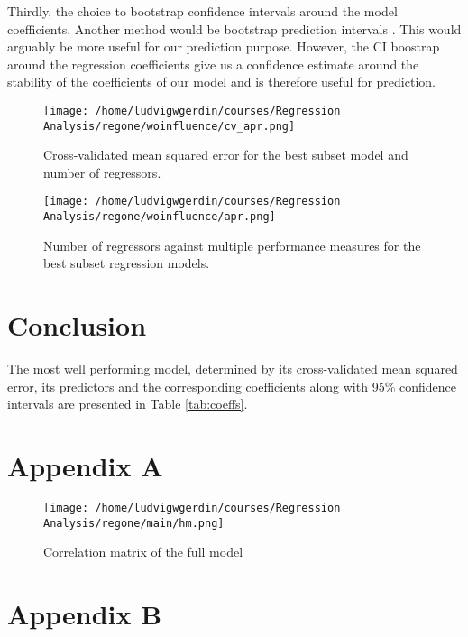 \documentclass[11pt]{article}
\begin{document}
Thirdly, the choice to bootstrap confidence intervals around the model coefficients. Another method 
would be bootstrap prediction intervals \cite{davison_hinkley_1997}. This 
would arguably be more useful for our prediction purpose. However, the CI boostrap around the regression 
coefficients give us a confidence estimate around the stability of the coefficients of our model and is
therefore useful for prediction.



\begin{figure}[htbp]
\centering
\texttt{[image: /home/ludvigwgerdin/courses/Regression Analysis/regone/woinfluence/cv\_apr.png]}
\caption{\label{fig:org2548892}
Cross-validated mean squared error for the best subset model and number of regressors.}
\end{figure}

\begin{figure}[htbp]
\centering
\texttt{[image: /home/ludvigwgerdin/courses/Regression Analysis/regone/woinfluence/apr.png]}
\caption{\label{fig:org4050128}
Number of regressors against multiple performance measures for the best subset regression models.}
\end{figure}

\newpage
\section{Conclusion}
\label{sec:org2cb0a5f}

The most well performing model, determined by its cross-validated 
mean squared error, its predictors and the corresponding coefficients along with 95\% confidence intervals are 
presented in Table \ref{tab:coeffs}. 



\section{Appendix A}
\label{sec:org71c000c}

\begin{figure}[H]
\centering
\texttt{[image: /home/ludvigwgerdin/courses/Regression Analysis/regone/main/hm.png]}
\caption{\label{fig:orga6cd4c7}
Correlation matrix of the full model}
\end{figure}

\newpage

\section{Appendix B}
\label{sec:orgd46e6c2}
\end{document}

